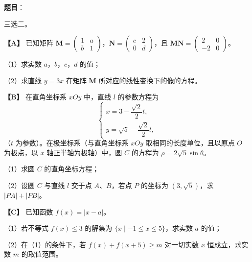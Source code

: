 \begin{answer}

\textbf{题目}：

三选二。

\textbf{【A】} 已知矩阵 $\boldsymbol M=\begin{pmatrix}1&a\\b&1\end{pmatrix}$，$\boldsymbol N=\begin{pmatrix}c&2\\0&d\end{pmatrix}$，且 $\boldsymbol M\boldsymbol N=\begin{pmatrix}2&0\\-2&0\end{pmatrix}$。

（1）求实数 $a$，$b$，$c$，$d$ 的值；

（2）求直线 $y=3x$ 在矩阵 $\boldsymbol M$ 所对应的线性变换下的像的方程。

\textbf{【B】} 在直角坐标系 $xOy$ 中，直线 $l$ 的参数方程为
\nopagebreak[4]
\[\begin{cases}x=3-\dfrac{\sqrt2}{2}t,\\y=\sqrt5-\dfrac{\sqrt2}{2}t,\end{cases}\]
（$t$ 为参数）。在极坐标系（与直角坐标系 $xOy$ 取相同的长度单位，且以原点 $O$ 为极点，以 $x$ 轴正半轴为极轴）中，圆 $C$ 的方程为 $\rho=2\sqrt5\sin\theta$。

（1）求圆 $C$ 的直角坐标方程；

（2）设圆 $C$ 与直线 $l$ 交于点 $A$、$B$，若点 $P$ 的坐标为 $(3,\sqrt5)$，求 $|PA|+|PB|$。

\vspace{0.8\baselineskip}
\textbf{【C】} 已知函数 $f(x)=|x-a|$。

（1）若不等式 $f(x)\leqslant3$ 的解集为 $\{x\mid-1\leqslant x\leqslant5\}$，求实数 $a$ 的值；

（2）在（1）的条件下，若 $f(x)+f(x+5)\geqslant m$ 对一切实数 $x$ 恒成立，求实数 $m$ 的取值范围。


\end{answer}
